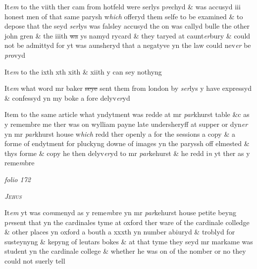 \documentclass[12pt, a4paper]{book}
\begin{document}
            			
		\ifthenelse{\isodd{\thepage}}
		{\reversemarginpar}
		{\normalmarginpar}
		It\textit{em} to the viith ther cam from hotfeld were serlys p\textit{re}chyd \& was accusyd iii honest men of that same parysh w\textit{hich} offeryd them selfe to be examined \& to depose that the seyd \textit{ser}lys was falsley accusyd the on was callyd bulle the other john gren \& the iiith \sout{wa }ys namyd rycard \& they taryed at caunt\textit{er}bury \& could not be admittyd for yt was  aunsheryd that a negatyve yn the law could nev\textit{er }be \textit{pro}vyd
            		
            		
            			
		\ifthenelse{\isodd{\thepage}}
		{\reversemarginpar}
		{\normalmarginpar}
		It\textit{em} to the ixth xth xith \& xiith y can sey nothyng
            		
            			
		\ifthenelse{\isodd{\thepage}}
		{\reversemarginpar}
		{\normalmarginpar}
		It\textit{em} what word mr baker \sout{seye }sent them from london by \textit{ser}lys y have expressyd \& confessyd yn my boke a fore delyv\textit{er}yd
            		
            			
		\ifthenelse{\isodd{\thepage}}
		{\reversemarginpar}
		{\normalmarginpar}
		Item to the same article what yndytment was redde at mr \textit{par}khurst table \&c as y remembre me ther was on wylliam payne late undersheryff at supper or dyn\textit{er} yn mr \textit{par}khurst house w\textit{hich} redd ther openly a for the sessions a copy \& a  forme of endytment for pluckyng downe of images yn the paryssh off elmested \& thys forme \& copy he then delyv\textit{er}yd to mr \textit{par}kehurst \& he redd i\textit{n} yt ther as y reme\textit{m}bre

\dotfill
						\newpage
{}

\textit{folio 172}


               
				\begin{center} \begin{large} {\scshape \textit{Jehus}} \end{large} \end{center}
			
 	

	
		\ifthenelse{\isodd{\thepage}}
		{\reversemarginpar}
		{\normalmarginpar}
		It\textit{em} yt was co\textit{m}menyd as y reme\textit{m}bre yn mr \textit{par}kehurst house petite beyng p\textit{re}sent that yn the cardinales tyme at oxford ther ware of the cardinale colledge \& other places yn oxford a bouth a xxxth yn number abiuryd \& troblyd for susteynyng \& kepyng of leutars bokes \& at that tyme they seyd mr markame was student yn the cardinale college \& whether he was on of the nomber or no they could  not suerly tell 
\end{document}
